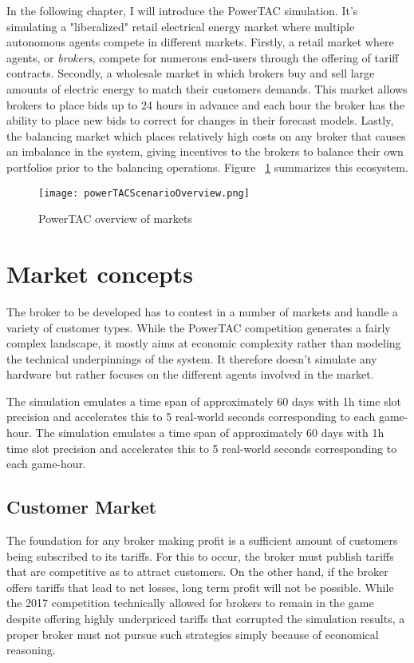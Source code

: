 In the following chapter, I will introduce the \ac{PowerTAC} simulation. It's simulating a "liberalized" retail electrical energy market where multiple autonomous agents compete in different markets. Firstly, a retail market where agents, or \emph{brokers}, compete for numerous end-users through the offering of tariff contracts. Secondly, a wholesale market in which brokers buy and sell large amounts of electric energy to match their customers demands. This market allows brokers to place bids up to 24 hours in advance and each hour the broker has the ability to place new bids to correct for changes in their forecast models. Lastly, the balancing market which places relatively high costs on any broker that causes an imbalance in the system, giving incentives to the brokers to balance their own portfolios prior to the balancing operations. Figure ~\ref{fig:powertacoverview} summarizes this ecosystem.
\begin{figure}[!h]
    \centering
    \texttt{[image: powerTACScenarioOverview.png]}
	\caption{\ac{PowerTAC} overview of markets}
    \label{fig:powertacoverview}
\end{figure}

\section{Market concepts}

The broker to be developed has to contest in a number of markets and handle a variety of customer types. While the \ac{PowerTAC} competition generates a fairly complex landscape, it mostly aims at economic complexity rather than modeling the technical underpinnings of the system. It therefore doesn't simulate any hardware but rather focuses on the different agents involved in the market.

The simulation emulates a time span of approximately 60 days with 1h time slot precision and accelerates this to 5 real-world seconds corresponding to each game-hour. The simulation emulates a time span of approximately 60 days with 1h time slot precision and accelerates this to 5 real-world seconds corresponding to each game-hour.


\subsection{Customer Market}

The foundation for any broker making profit is a sufficient amount of customers being subscribed to its tariffs. For this to occur, the broker must publish tariffs that are competitive as to attract customers. On the other hand, if the broker offers tariffs that lead to net losses, long term profit will not be possible. While the 2017 competition technically allowed for brokers to remain in the game despite offering highly underpriced tariffs that corrupted the simulation results, a proper broker must not pursue such strategies simply because of economical reasoning. %

